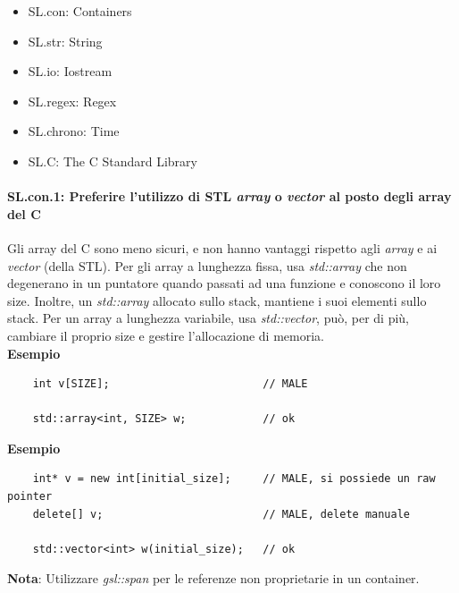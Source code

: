\begin{itemize}
	\item \textsf{\small SL.con: Containers}
	\item \textsf{\small SL.str: String}
	\item \textsf{\small SL.io: Iostream}
	\item \textsf{\small SL.regex: Regex}
	\item \textsf{\small SL.chrono: Time}
	\item \textsf{\small SL.C: The C Standard Library}
\end{itemize}


\paragraph{SL.con.1: Preferire l'utilizzo di STL \emph{array} o \emph{vector} al posto degli array del C}

\textsf{\small Gli array del C sono meno sicuri, e non hanno vantaggi rispetto agli \emph{array} e ai \emph{vector} (della STL). Per gli array a lunghezza fissa, usa \emph{std::array} che non degenerano in un puntatore quando passati ad una funzione e conoscono il loro size. Inoltre, un \emph{std::array} allocato sullo stack, mantiene i suoi elementi sullo stack. Per un array a lunghezza variabile, usa \emph{std::vector}, può, per di più, cambiare il proprio size e gestire l'allocazione di memoria. } \\

\textsf{\small \textbf{Esempio}}

\begin{lstlisting}
	int v[SIZE];                        // MALE
	
	std::array<int, SIZE> w;            // ok
\end{lstlisting}

\textsf{\small \textbf{Esempio}}

\begin{lstlisting}
	int* v = new int[initial_size];     // MALE, si possiede un raw pointer
	delete[] v;                         // MALE, delete manuale
	
	std::vector<int> w(initial_size);   // ok
\end{lstlisting}

\textsf{\small \textbf{Nota}: Utilizzare \emph{gsl::span} per le referenze non proprietarie in un container.} \\

